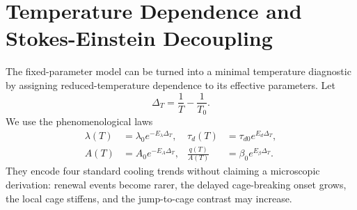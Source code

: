 \documentclass[aps,preprint,onecolumn,superscriptaddress,nofootinbib]{revtex4-2}
\begin{document}
\section{Temperature Dependence and Stokes-Einstein Decoupling}

The fixed-parameter model can be turned into a minimal temperature diagnostic
by assigning reduced-temperature dependence to its effective parameters. Let
\begin{equation}
  \Delta_T=\frac{1}{T}-\frac{1}{T_0}.
\end{equation}
We use the phenomenological laws
\begin{align}
  \lambda(T)&=\lambda_0 e^{-E_\lambda\Delta_T},&
  \tau_d(T)&=\tau_{d0} e^{E_d\Delta_T},\\
  A(T)&=A_0 e^{-E_A\Delta_T},&
  \frac{q(T)}{A(T)}&=\beta_0 e^{E_\beta\Delta_T}.
\end{align}
They encode four standard cooling trends without claiming a microscopic
derivation: renewal events become rarer, the delayed cage-breaking onset grows,
the local cage stiffens, and the jump-to-cage contrast may increase.
\end{document}
